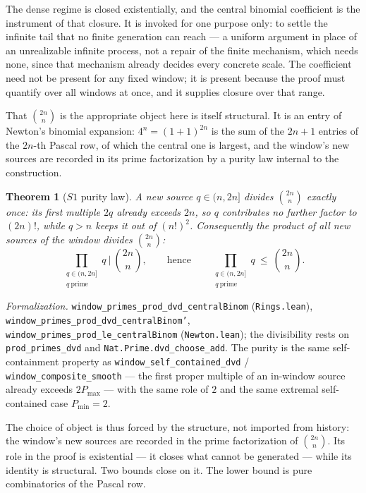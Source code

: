 \documentclass[11pt,a4paper]{amsart}
\theoremstyle{plain}
\newtheorem{theorem}{Theorem}[section]
\theoremstyle{definition}
\theoremstyle{plain}
\theoremstyle{remark}
\newcommand{\lean}[1]{\textup{\texttt{#1}}}
\newcommand{\Formal}[1]{\par\smallskip\noindent\emph{Formalization.} #1\par\smallskip}
\begin{document}
The dense regime is closed existentially, and the central binomial coefficient is the
instrument of that closure. It is invoked for one purpose only: to settle the infinite tail
that no finite generation can reach --- a uniform argument in place of an unrealizable infinite
process, not a repair of the finite mechanism, which needs none, since that mechanism already
decides every concrete scale. The coefficient need not be present for any fixed window; it is
present because the proof must quantify over all windows at once, and it supplies closure over
that range.

That $\binom{2n}{n}$ is the appropriate object here is itself structural. It is an entry of
Newton's binomial expansion: $4^n=(1+1)^{2n}$ is the sum of the $2n+1$ entries of the $2n$-th
Pascal row, of which the central one is largest, and the window's new sources are recorded in
its prime factorization by a purity law internal to the construction.

\begin{theorem}[$S1$ purity law]\label{thm:s1}
A new source $q\in(n,2n]$ divides $\binom{2n}{n}$ exactly once: its first multiple $2q$
already exceeds $2n$, so $q$ contributes no further factor to $(2n)!$, while $q>n$ keeps it out
of $(n!)^2$.
Consequently the product of all new sources of the window divides $\binom{2n}{n}$:
\[
\prod_{\substack{q\in(n,2n]\\ q\ \text{prime}}} q \ \Big|\ \binom{2n}{n},
\qquad\text{hence}\qquad
\prod_{\substack{q\in(n,2n]\\ q\ \text{prime}}} q \ \le\ \binom{2n}{n}.
\]
\end{theorem}

\Formal{\lean{window\_primes\_prod\_dvd\_centralBinom} (\lean{Rings.lean}),
\lean{window\_primes\_prod\_dvd\_centralBinom'},
\lean{window\_primes\_prod\_le\_centralBinom} (\lean{Newton.lean}); the
divisibility rests on \lean{prod\_primes\_dvd} and
\lean{Nat.Prime.dvd\_choose\_add}. The purity is the same self-containment property as
\lean{window\_self\_contained\_dvd} / \lean{window\_composite\_smooth} --- the first proper
multiple of an in-window source already exceeds $2P_{\max}$ --- with the same role of $2$ and
the same extremal self-contained case $P_{\min}=2$.}

The choice of object is thus forced by the structure, not imported from history: the window's
new sources are recorded in the prime factorization of $\binom{2n}{n}$. Its role in the proof
is existential --- it closes what cannot be generated --- while its identity is structural.
Two bounds close on it. The lower bound is pure combinatorics of the Pascal row.
\end{document}
